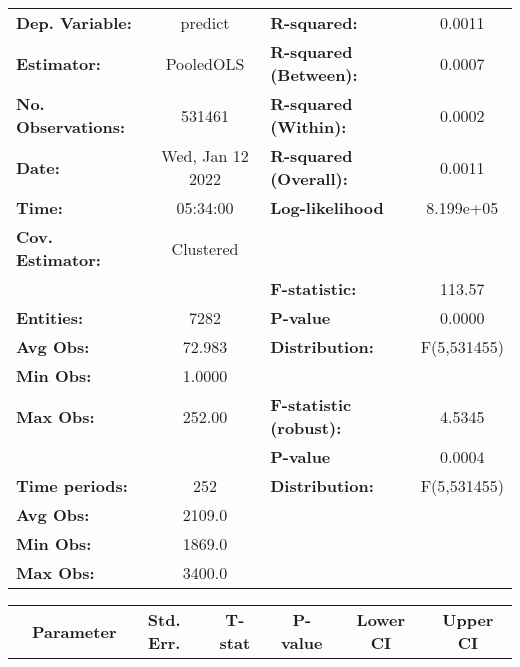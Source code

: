 \begin{center}
\begin{tabular}{lclc}
\toprule
\textbf{Dep. Variable:}    &      predict       & \textbf{  R-squared:         }   &      0.0011      \\
\textbf{Estimator:}        &     PooledOLS      & \textbf{  R-squared (Between):}  &      0.0007      \\
\textbf{No. Observations:} &       531461       & \textbf{  R-squared (Within):}   &      0.0002      \\
\textbf{Date:}             &  Wed, Jan 12 2022  & \textbf{  R-squared (Overall):}  &      0.0011      \\
\textbf{Time:}             &      05:34:00      & \textbf{  Log-likelihood     }   &    8.199e+05     \\
\textbf{Cov. Estimator:}   &     Clustered      & \textbf{                     }   &                  \\
\textbf{}                  &                    & \textbf{  F-statistic:       }   &      113.57      \\
\textbf{Entities:}         &        7282        & \textbf{  P-value            }   &      0.0000      \\
\textbf{Avg Obs:}          &       72.983       & \textbf{  Distribution:      }   &   F(5,531455)    \\
\textbf{Min Obs:}          &       1.0000       & \textbf{                     }   &                  \\
\textbf{Max Obs:}          &       252.00       & \textbf{  F-statistic (robust):} &      4.5345      \\
\textbf{}                  &                    & \textbf{  P-value            }   &      0.0004      \\
\textbf{Time periods:}     &        252         & \textbf{  Distribution:      }   &   F(5,531455)    \\
\textbf{Avg Obs:}          &       2109.0       & \textbf{                     }   &                  \\
\textbf{Min Obs:}          &       1869.0       & \textbf{                     }   &                  \\
\textbf{Max Obs:}          &       3400.0       & \textbf{                     }   &                  \\
\bottomrule
\end{tabular}
\begin{tabular}{lcccccc}
                & \textbf{Parameter} & \textbf{Std. Err.} & \textbf{T-stat} & \textbf{P-value} & \textbf{Lower CI} & \textbf{Upper CI}  \\

\end{tabular}
\end{center}

